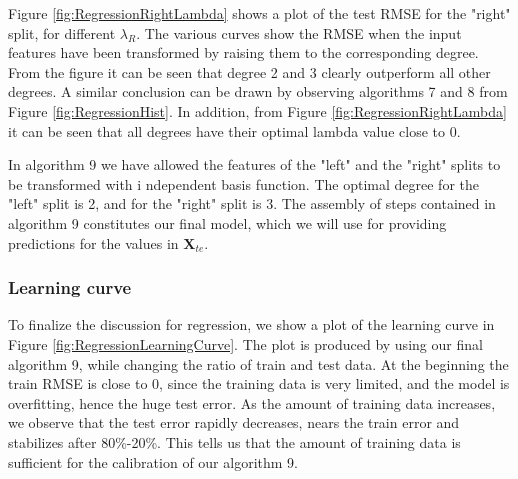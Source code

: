\documentclass{article} %
\begin{document}
Figure \ref{fig:RegressionRightLambda} shows a plot of the test RMSE for the "right" split, 
for different $\lambda_R$. 
The various curves show the RMSE when the input features have been transformed by raising 
them to the corresponding degree. 
From the figure it can be seen that degree 2 and 3 clearly outperform all other degrees. 
A similar conclusion can be drawn by observing algorithms 7 and 8 from Figure \ref{fig:RegressionHist}. 
In addition, from Figure \ref{fig:RegressionRightLambda} it can be seen that all degrees have 
their optimal lambda value close to 0.

In algorithm 9 we have allowed the features of the "left" and the "right" splits to be transformed with i
ndependent basis function. The optimal degree for the "left" split is 2, and for the "right" split is 3. 
The assembly of steps contained in algorithm 9 constitutes our final model, 
which we will use for providing predictions for the values in $\mathbf{X}_{te}$.


\subsubsection{Learning curve}

To finalize the discussion for regression, we show a plot of the learning curve in 
Figure \ref{fig:RegressionLearningCurve}. 
The plot is produced by using our final algorithm 9, while changing the ratio of train and test data.
At the beginning the train RMSE is close to 0, since the training data is very limited, 
and the model is overfitting, hence the huge test error. 
As the amount of training data increases, we observe that the test error rapidly decreases, 
nears the train error and stabilizes after 80\%-20\%. 
This tells us that the amount of training data is sufficient for the calibration of our algorithm 9.


\end{document}

